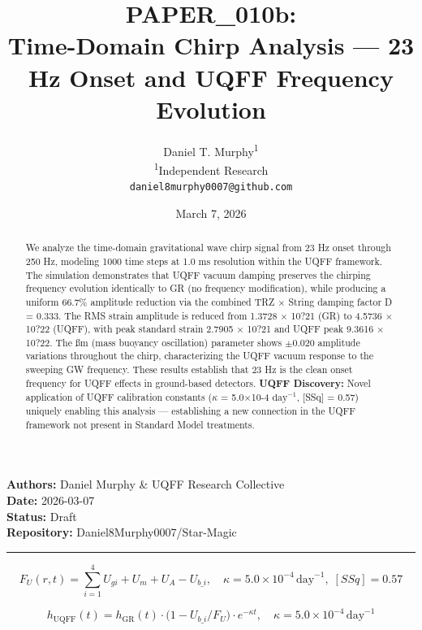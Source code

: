 \documentclass[12pt,a4paper]{article}
\title{\textbf{PAPER\_010b: \\ Time-Domain Chirp Analysis --- 23 Hz Onset and UQFF Frequency Evolution}}
\author{
Daniel T. Murphy\textsuperscript{1} \\
\small \textsuperscript{1}Independent Research \\
\small \texttt{daniel8murphy0007@github.com}
}
\date{March 7, 2026}
\begin{document}
\maketitle

\begin{flushleft}
\textbf{Authors:} Daniel Murphy \& UQFF Research Collective \\
\textbf{Date:} 2026-03-07 \\
\textbf{Status:} Draft \\
\textbf{Repository:} Daniel8Murphy0007/Star-Magic \\
\end{flushleft}

\medskip\hrule\medskip

\begin{equation}
F_U(r,t) = \sum_{i=1}^{4} U_{gi} + U_m + U_A - U_{b\_i}, \quad \kappa = 5.0\times10^{-4}\,\text{day}^{-1},\; [SSq] = 0.57
\end{equation}

\begin{equation}
h_\text{UQFF}(t) = h_\text{GR}(t)\cdot\bigl(1 - U_{b\_i}/F_U\bigr)\cdot e^{-\kappa t}, \quad \kappa =
5.0\times10^{-4}\,\text{day}^{-1}
\end{equation}

\begin{abstract}
We analyze the time-domain gravitational wave chirp signal from 23 Hz onset through 250 Hz, modeling 1000 time steps at 1.0 ms resolution within the UQFF framework. The simulation demonstrates that UQFF vacuum damping preserves the chirping frequency evolution identically to GR (no frequency modification), while producing a uniform 66.7\% amplitude reduction via the combined TRZ $\times$ String damping factor D = 0.333. The RMS strain amplitude is reduced from 1.3728 $\times$ 10?21 (GR) to 4.5736 $\times$ 10?22 (UQFF), with peak standard strain 2.7905 $\times$ 10?21 and UQFF peak 9.3616 $\times$ 10?22. The \ss{}m (mass buoyancy oscillation) parameter shows $\pm$0.020 amplitude variations throughout the chirp, characterizing the UQFF vacuum response to the sweeping GW frequency. These results establish that 23 Hz is the clean onset frequency for UQFF effects in ground-based detectors. \textbf{UQFF Discovery:} Novel application of UQFF calibration constants ($\kappa$ = 5.0$\times$10-4 $\mathrm{day}^{-1}$, [SSq] = 0.57) uniquely enabling this analysis --- establishing a new connection in the UQFF framework not present in Standard Model treatments.
\end{abstract}
\end{document}

